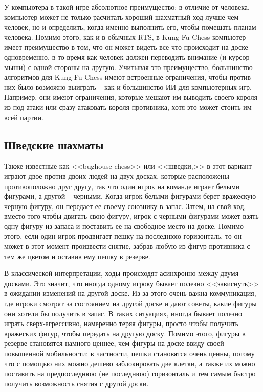 \documentclass{article}
\begin{document}
У компьютера в такой игре абсолютное преимущество:
в отличие от человека, компьютер может не только расчитать хороший шахматный ход лучше чем человек,
но и определить, когда именно выполнить его, чтобы помешать планам человека.
Помимо этого, как и в обычных RTS, в Kung-Fu Chess
компьютер имеет преимущество в том, что он может видеть все что происходит на доске одновременно,
в то время как человек должен переводить внимание (и курсор мыши) с одной стороны на другую.
Учитывая это преимущество,
большинство алгоритмов для Kung-Fu Chess 
имеют встроенные ограничения,
чтобы против них было возможно выиграть -- 
как и большинство ИИ для компьютерных игр.
Например, они имеют ограничения,
которые мешают им выводить своего короля из под атаки
или сразу атаковать короля противника,
хотя это может стоить им всей партии.

\subsection{Шведские шахматы}

Также известные как <<bughouse chess>> или <<шведки,>>
в этот вариант играют двое против двоих людей на двух досках,
которые расположены противоположно друг другу,
так что один игрок на команде играет белыми фигурами, а другой -- черными.
Когда игрок белыми фигурами берет вражескую черную фигуру, он передает ее
своему союзнику в запас.
Затем, на свой ход, вместо того чтобы двигать свою фигуру,
игрок с черными фигурами может взять одну фигуру из запаса и поставить ее на свободное место на доске.
Помимо этого, если один игрок продвигает пешку на последнюю горизонталь,
то он может в этот момент произвести снятие, забрав любую из фигур противника с тем же цветом и оставив ему пешку в резерве.

В классической интерпретации, ходы происходят асинхронно между двумя досками.
Это значит, что иногда одному игроку бывает полезно <<зависнуть>>
в ожидании изменений на другой доске.
Из-за этого очень важна коммуникация, где игроки смотрят за состоянием на другой доске
и дают советы, какие фигуры они хотели бы получить в запас. 
В таких ситуациях, иногда бывает полезно играть сверх-агрессивно,
намеренно теряя фигуры,
просто чтобы получить вражеских фигур, чтобы передать на другую доску.
Помимо этого, фигуры в резерве становятся намного ценнее, чем фигуры на доске ввиду своей повышенной мобильности:
в частности, пешки становятся очень ценны,
потому что с помощью них можно дешево заблокировать две клетки,
а также их можно поставить на предпоследнюю (не последнюю) горизонталь и тем самым быстро получить возможность снятия с другой доски.
\end{document}
